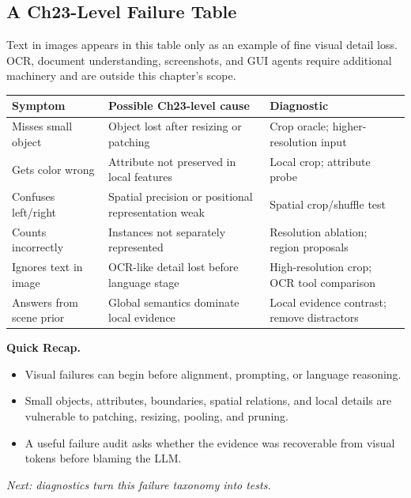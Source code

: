 \subsection{A Ch23-Level Failure Table}

Text in images appears in this table only as an example of fine visual detail loss. OCR, document understanding, screenshots, and GUI agents require additional machinery and are outside this chapter's scope.

\begin{center}
\small
\begin{tabularx}{\textwidth}{@{}p{3.0cm}p{5.1cm}X@{}}
\toprule
\textbf{Symptom} & \textbf{Possible Ch23-level cause} & \textbf{Diagnostic} \\
\midrule
Misses small object & Object lost after resizing or patching & Crop oracle; higher-resolution input \\
Gets color wrong & Attribute not preserved in local features & Local crop; attribute probe \\
Confuses left/right & Spatial precision or positional representation weak & Spatial crop/shuffle test \\
Counts incorrectly & Instances not separately represented & Resolution ablation; region proposals \\
Ignores text in image & OCR-like detail lost before language stage & High-resolution crop; OCR tool comparison \\
Answers from scene prior & Global semantics dominate local evidence & Local evidence contrast; remove distractors \\
\bottomrule
\end{tabularx}
\end{center}

\begin{quickrecap}
\textbf{Quick Recap.}
\begin{itemize}[nosep,leftmargin=1.5em]
  \item Visual failures can begin before alignment, prompting, or language reasoning.
  \item Small objects, attributes, boundaries, spatial relations, and local details are vulnerable to patching, resizing, pooling, and pruning.
  \item A useful failure audit asks whether the evidence was recoverable from visual tokens before blaming the LLM.
\end{itemize}
\textit{Next: diagnostics turn this failure taxonomy into tests.}
\end{quickrecap}


